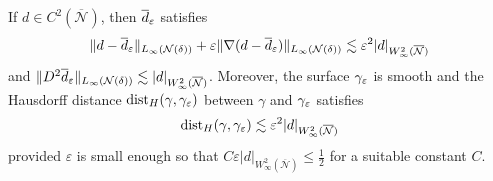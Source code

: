 \begin{lemma}[properties of $\de$]\label{L:properties-de}
If $d\in C^2(\overline{\mathcal{N}})$, then
$\de$ satisfies
%
\[
\| d - \overline{d}_\varepsilon \|_{L_\infty({\mathcal N(\delta)})}
+ \varepsilon \| \nabla(d - \overline{d}_\varepsilon) \|_{L_\infty({\mathcal N(\delta)})}
\lesssim \varepsilon^{2} |d|_{W_\infty^2 (\overline{\mathcal{N}})}
\]
%
and $\|D^2 \overline{d}_\varepsilon\|_{L_\infty({\mathcal N(\delta)})} \lesssim
 |d|_{W_\infty^2(\overline{\mathcal{N}})}$.
Moreover, the surface ${\gamma_\varepsilon}$ is smooth and the Hausdorff distance $\operatorname{dist}_H(\gamma,{\gamma_\varepsilon})$
between $\gamma$ and ${\gamma_\varepsilon}$ satisfies
%
\[
\operatorname{dist}_H(\gamma,{\gamma_\varepsilon}) \lesssim \varepsilon^{2}
|d|_{W_\infty^2(\overline{\mathcal{N}})}
\]
%
provided $\varepsilon$ is small enough so that $C\varepsilon
|d|_{W_\infty^2(\overline{\mathcal{N}})} \le \frac12$ for a suitable constant $C$.
\end{lemma}
%
